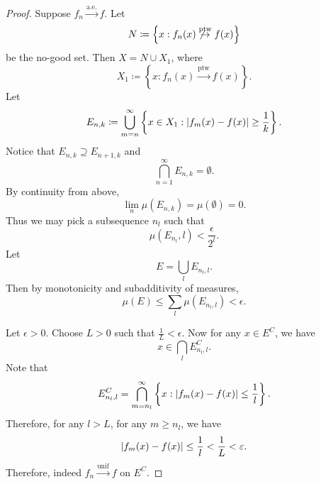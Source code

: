 \documentclass[notoc,notitlepage]{tufte-book}
\newcommand{\convptw}{\overset{\text{ptw}}{\to}}
\newcommand{\convae}{\overset{\text{a.e.}}{\to}}
\newcommand{\convunif}{\overset{\text{unif}}{\to}}
\begin{document}
\begin{proof}
  Suppose $f_n \convae f$. Let
  \begin{equation*}
    N \coloneqq \left\{ x : f_n(x) \not\convptw f(x) \right\}
  \end{equation*}
  be the no-good set. Then $X = N \cup X_1$, where
  \begin{equation*}
    X_1 \coloneqq \left\{ x : f_n(x) \convptw f(x) \right\}.
  \end{equation*}
  Let
  \begin{equation*}
    E_{n, k} \coloneqq \bigcup_{m=n}^{\infty} \left\{ 
      x \in X_1 : \left|f_m(x) - f(x)\right| \geq \frac{1}{k}
    \right\}.
  \end{equation*}
  Notice that $E_{n, k} \supseteq E_{n + 1, k}$ and
  \begin{equation*}
    \bigcap_{n=1}^{\infty} E_{n, k} = \emptyset.
  \end{equation*}
  By continuity from above,
  \begin{equation*}
    \lim_n \mu(E_{n, k}) = \mu(\emptyset) = 0.
  \end{equation*}
  Thus we may pick a subsequence $n_l$ such that
  \begin{equation*}
    \mu(E_{n_l}, l) < \frac{\epsilon}{2^l}.
  \end{equation*}
  Let
  \begin{equation*}
    E = \bigcup_{l} E_{n_l, l}.
  \end{equation*}
  Then by monotonicity and subadditivity of measures,
  \begin{equation*}
    \mu(E) \leq \sum_{l} \mu(E_{n_l, l}) < \epsilon.
  \end{equation*}

  Let $\epsilon > 0$. Choose $L > 0$ such that $\frac{1}{L} < \epsilon$.
  Now for any $x \in E^C$, we have
  \begin{equation*}
    x \in \bigcap_{l} E_{n_l, l}^C.
  \end{equation*}
  Note that
  \begin{equation*}
    E_{n_l, l}^C = \bigcap_{m=n_l}^{\infty} \left\{
      x : \left|f_m(x) - f(x)\right| \leq \frac{1}{l}
    \right\}.
  \end{equation*}
  Therefore, for any $l > L$, for any $m \geq n_l$, we have
  \begin{equation*}
    \left|f_m(x) - f(x)\right| \leq \frac{1}{l} < \frac{1}{L} < \varepsilon.
  \end{equation*}
  Therefore, indeed $f_n \convunif f$ on $E^C$.
\end{proof}
\end{document}

